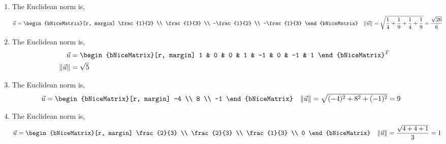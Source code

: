 \begin{enumerate}
    \item The Euclidean norm is,
          \begin{align}
              \vec{u}               & = \begin{bNiceMatrix}[r, margin]
                                            \frac{1}{2}  \\ \frac{1}{3} \\
                                            -\frac{1}{2} \\ -\frac{1}{3}
                                        \end{bNiceMatrix}  &
              \lVert \vec{u} \rVert & = \sqrt{\frac{1}{4} + \frac{1}{9}
                  + \frac{1}{4} + \frac{1}{9}} = \frac{\sqrt{26}}{6}
          \end{align}

    \item The Euclidean norm is,
          \begin{align}
              \vec{u}               & = \begin{bNiceMatrix}[r, margin]
                                            1 & 0 & 0 & 1 & -1 & 0 & -1 & 1
                                        \end{bNiceMatrix}^T \\
              \lVert \vec{u} \rVert & = \sqrt{5}
          \end{align}

    \item The Euclidean norm is,
          \begin{align}
              \vec{u}               & = \begin{bNiceMatrix}[r, margin]
                                            -4 \\ 8 \\ -1
                                        \end{bNiceMatrix}   &
              \lVert \vec{u} \rVert & = \sqrt{(-4)^2 + 8^2 + (-1)^2} = 9
          \end{align}

    \item The Euclidean norm is,
          \begin{align}
              \vec{u}               & = \begin{bNiceMatrix}[r, margin]
                                            \frac{2}{3} \\ \frac{2}{3} \\
                                            \frac{1}{3} \\ 0
                                        \end{bNiceMatrix} &
              \lVert \vec{u} \rVert & = \frac{\sqrt{4 + 4 + 1}}{3} = 1
          \end{align}


\end{enumerate}
